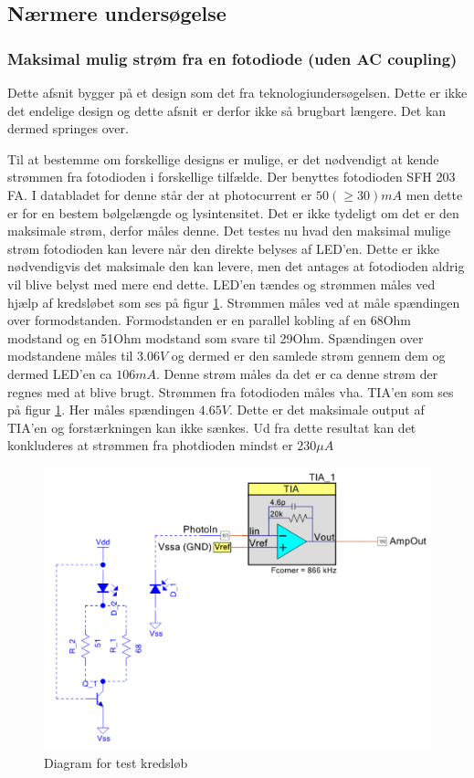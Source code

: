 \documentclass[HardwareDesign/HardwareDesign_main.tex]{subfiles}
\begin{document}
\iffalse
{
\subsection{Nærmere undersøgelse}
\subsubsection{Maksimal mulig strøm fra en fotodiode (uden AC coupling)} \label{sec:CupSensorCurrentTest}
{
Dette afsnit bygger på et design som det fra teknologiundersøgelsen. Dette er ikke det endelige design og dette afsnit er derfor ikke så brugbart længere. Det kan dermed springes over.

Til at bestemme om forskellige designs er mulige, er det nødvendigt at kende strømmen fra fotodioden i forskellige tilfælde.
Der benyttes fotodioden SFH 203 FA. I databladet for denne står der at photocurrent er $50 (\geq 30) \si{mA}$ men dette er for en bestem bølgelængde og lysintensitet. Det er ikke tydeligt om det er den maksimale strøm, derfor måles denne.
Det testes nu hvad den maksimal mulige strøm fotodioden kan levere når den direkte belyses af LED'en. Dette er ikke nødvendigvis det maksimale den kan levere, men det antages at fotodioden aldrig vil blive belyst med mere end dette.
LED'en tændes og strømmen måles ved hjælp af kredsløbet som ses på figur \ref{fig:PhotodiodeTestDiagram}. Strømmen måles ved at måle spændingen over formodstanden. Formodstanden er en parallel kobling af en 68Ohm modstand og en 51Ohm modstand som svare til 29Ohm. Spændingen over modstandene måles til $3.06\si{V}$ og dermed er den samlede strøm gennem dem og dermed LED'en ca $106\si{mA}$. Denne strøm måles da det er ca denne strøm der regnes med at blive brugt. Strømmen fra fotodioden måles vha. TIA'en som ses på figur \ref{fig:PhotodiodeTestDiagram}. Her måles spændingen $4.65V$. Dette er det maksimale output af TIA'en og forstærkningen kan ikke sænkes. Ud fra dette resultat kan det konkluderes at strømmen fra photdioden mindst er $230\si{\mu A}$

\begin{figure}[H]
    \centering
    \includegraphics[width=\textwidth]{HardwareDesign/CupSensor/graphics/DiodeCurrentTestDiagram.PNG}
    \caption{Diagram for test kredsløb}
    \label{fig:PhotodiodeTestDiagram}
\end{figure}

}}
\end{document}
